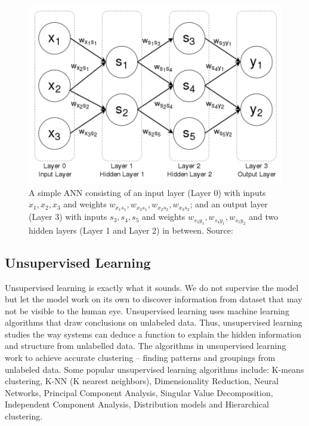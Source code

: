 \documentclass[master]{thesis-uestc}
\begin{document}
\begin{figure}[ht]
\includegraphics[width=5in]{pic/ANN.png}
\caption{A simple ANN consisting of an input layer (Layer 0) with inputs $x_1, x_2, x_3$ and weights $w_{x_1s_1}, w_{x_2s_1}, w_{x_2s_2}, w_{x_3s_2}$; and an output layer (Layer 3) with inputs $s_3, s_4, s_5$ and weights $w_{s_3y_1}, w_{s_4y_1}, w_{s_5y_2}$ and two hidden layers (Layer 1 and Layer 2) in between. Source:}
\label{fig_ANN}
\end{figure}

\subsection{Unsupervised Learning}
Unsupervised learning is exactly what it sounds. We do not supervise the model but let the model work on its own to discover information from dataset that may not be visible to the human eye. Unsupervised learning uses machine learning algorithms that draw conclusions on unlabeled data. Thus, unsupervised learning studies the way systems can deduce a function to explain the hidden information and structure from unlabelled data. The algorithms in unsupervised learning work to achieve accurate clustering – finding patterns and groupings from unlabeled data. Some popular unsupervised learning algorithms include: K-means clustering, K-NN (K nearest neighbors), Dimensionality Reduction, Neural Networks, Principal Component Analysis, Singular Value Decomposition, Independent Component Analysis, Distribution models and Hierarchical clustering.
\end{document}
